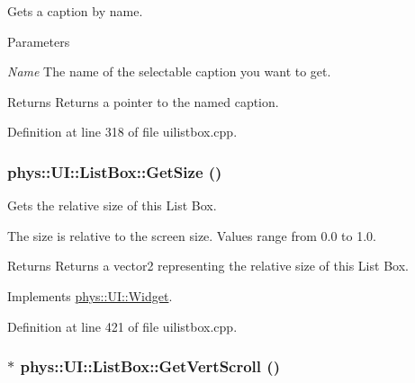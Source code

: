 Gets a caption by name. 


\begin{DoxyParams}{Parameters}
\item[{\em Name}]The name of the selectable caption you want to get. \end{DoxyParams}
\begin{DoxyReturn}{Returns}
Returns a pointer to the named caption. 
\end{DoxyReturn}


Definition at line 318 of file uilistbox.cpp.

\hypertarget{classphys_1_1UI_1_1ListBox_a7af2cced185d63be6a62d5122c700d81}{
\subsubsection[{GetSize}]{ phys::UI::ListBox::GetSize ()}}
\label{d0/d28/classphys_1_1UI_1_1ListBox_a7af2cced185d63be6a62d5122c700d81}


Gets the relative size of this List Box. 

The size is relative to the screen size. Values range from 0.0 to 1.0. \begin{DoxyReturn}{Returns}
Returns a vector2 representing the relative size of this List Box. 
\end{DoxyReturn}


Implements \hyperlink{classphys_1_1UI_1_1Widget_a07039c19e57de314147ce066417da0a2}{phys::UI::Widget}.



Definition at line 421 of file uilistbox.cpp.

\hypertarget{classphys_1_1UI_1_1ListBox_a9f62475c3a81772407af38076363060e}{
\subsubsection[{GetVertScroll}]{ $\ast$ phys::UI::ListBox::GetVertScroll ()}}
\label{d0/d28/classphys_1_1UI_1_1ListBox_a9f62475c3a81772407af38076363060e}


